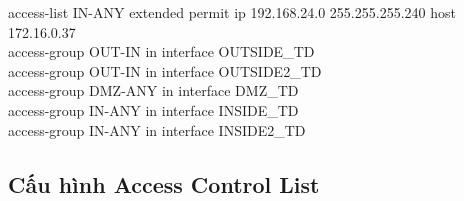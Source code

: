 \documentclass[a4paper, 12pt]{article}
\begin{document}
{\hspace*{1cm}access-list IN-ANY extended permit ip 192.168.24.0 255.255.255.240 host 172.16.0.37\\
\hspace*{1cm}access-group OUT-IN in interface OUTSIDE\_TD\\
\hspace*{1cm}access-group OUT-IN in interface OUTSIDE2\_TD\\
\hspace*{1cm}access-group DMZ-ANY in interface DMZ\_TD\\
\hspace*{1cm}access-group IN-ANY in interface INSIDE\_TD\\
\hspace*{1cm}access-group IN-ANY in interface INSIDE2\_TD\\}

\subsection{Cấu hình Access Control List}
\end{document}
